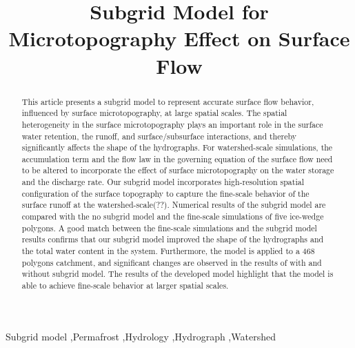 \documentclass[review,11pt]{elsarticle}
\begin{document}
\begin{frontmatter}

\title{Subgrid Model for Microtopography Effect on Surface Flow}







\begin{abstract}
This article presents a subgrid model to represent accurate surface flow behavior, influenced by surface microtopography, at large spatial scales. The spatial heterogeneity in the surface microtopography plays an important role in the surface water retention, the runoff, and surface/subsurface interactions, and thereby significantly affects the shape of the hydrographs. For watershed-scale simulations, the accumulation term and the flow law in the governing equation of the surface flow need to be altered to incorporate the effect of surface microtopography on the water storage and the discharge rate. Our subgrid model incorporates high-resolution spatial configuration of the surface topography to capture the fine-scale behavior of the surface runoff at the watershed-scale(??). Numerical results of the subgrid model are compared with the no subgrid model and the fine-scale simulations of five ice-wedge polygons. A good match between the fine-scale simulations and the subgrid model results confirms that our subgrid model improved the shape of the hydrographs and the total water content in the system. Furthermore, the model is applied to a 468 polygons catchment, and significant changes are observed in the results of with and without subgrid model. The results of the developed model highlight that the model is able to achieve fine-scale behavior at larger spatial scales.
\end{abstract}

\begin{keyword}
Subgrid model \sep Permafrost \sep Hydrology  \sep Hydrograph \sep Watershed
\end{keyword}


\end{frontmatter}
\end{document}
